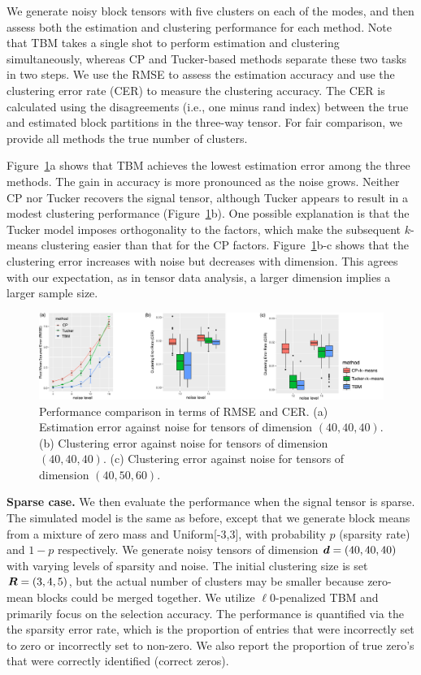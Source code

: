 \documentclass{article}
\begin{document}
We generate noisy block tensors with five clusters on each of the modes, and then assess both the estimation and clustering performance for each method. Note that TBM takes a single shot to perform estimation and clustering simultaneously, whereas CP and Tucker-based methods separate these two tasks in two steps. We use the RMSE to assess the estimation accuracy and use the clustering error rate (CER) to measure the clustering accuracy. The CER is calculated using the disagreements (i.e., one minus rand index) between the true and estimated block partitions in the three-way tensor. For fair comparison, we provide all methods the true number of clusters. 

Figure~\ref{fig4}a shows that TBM achieves the lowest estimation error among the three methods. The gain in accuracy is more pronounced as the noise grows. Neither CP nor Tucker recovers the signal tensor, although Tucker appears to result in a modest clustering performance (Figure~\ref{fig4}b). One possible explanation is that the Tucker model imposes orthogonality to the factors, which make the subsequent $k$-means clustering easier than that for the CP factors. Figure~\ref{fig4}b-c shows that the clustering error increases with noise but decreases with dimension. This agrees with our expectation, as in tensor data analysis, a larger dimension implies a larger sample size. 



\begin{figure}[h!]
\centering
\includegraphics[width=.8\textwidth]{figures/compare}
\caption{\small Performance comparison in terms of RMSE and CER. (a) Estimation error against noise for tensors of dimension $(40,40,40)$. (b) Clustering error against noise for tensors of dimension $(40,40,40)$. (c) Clustering error against noise for tensors of dimension $(40,50,60)$.} \label{fig4}
\vspace{-.2cm}
\end{figure}


\textbf{Sparse case.} We then evaluate the performance when the signal tensor is sparse. The simulated model is the same as before, except that we generate block means from a mixture of zero mass and Uniform[-3,3], with probability $p$ (sparsity rate) and $1-p$ respectively. We generate noisy tensors of dimension $\bm{d}=(40,40,40)$ with varying levels of sparsity and noise. The initial clustering size is set $\bm{R}=(3,4,5)$, but the actual number of clusters may be smaller because zero-mean blocks could be merged together. We utilize $\ell0$-penalized TBM and primarily focus on the selection accuracy. 
The performance is quantified via the the sparsity error rate, which is the proportion of entries that were incorrectly set to zero or incorrectly set to non-zero. We also report the proportion of true zero's that were correctly identified (correct zeros). 
\end{document}

